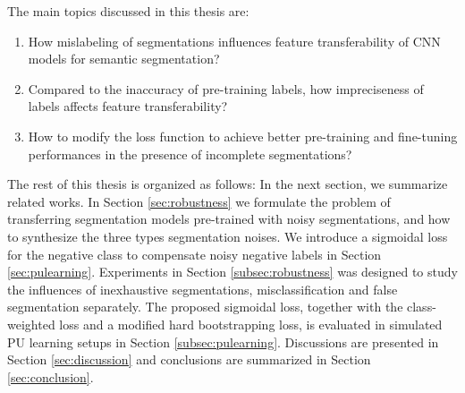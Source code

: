 
The main topics discussed in this thesis are:
\begin{enumerate}
  \item How mislabeling of segmentations influences feature transferability of CNN models for semantic segmentation?
  \item Compared to the inaccuracy of pre-training labels, how impreciseness of labels affects feature transferability?
  \item How to modify the loss function to achieve better pre-training and fine-tuning performances in the presence of incomplete segmentations?
\end{enumerate}


The rest of this thesis is organized as follows:
In the next section, we summarize related works.
In Section \ref{sec:robustness} we formulate the problem of transferring segmentation models pre-trained with noisy segmentations, and how to synthesize the three types segmentation noises.
We introduce a sigmoidal loss for the negative class to compensate noisy negative labels in Section \ref{sec:pulearning}.
Experiments in Section \ref{subsec:robustness} was designed to study the influences of inexhaustive segmentations, misclassification and false segmentation separately.
The proposed sigmoidal loss, together with the class-weighted loss and a modified hard bootstrapping loss, is evaluated in simulated PU learning setups in Section \ref{subsec:pulearning}.
Discussions are presented in Section \ref{sec:discussion} and conclusions are summarized in Section \ref{sec:conclusion}.
